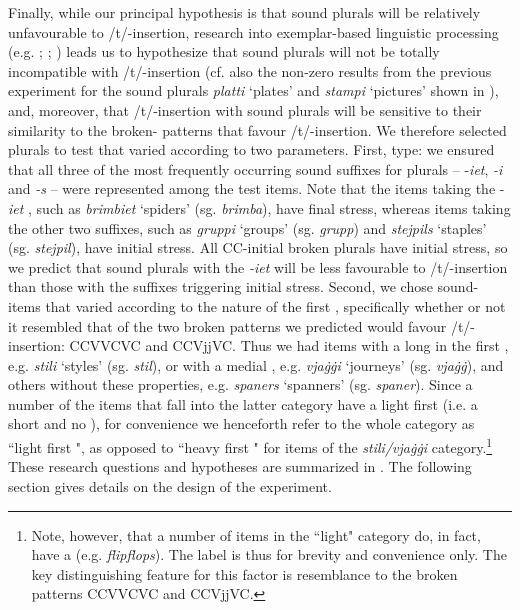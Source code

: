 \documentclass[output=paper]{langsci/langscibook}
\begin{document}
Finally, while our principal hypothesis is that sound plurals will be relatively unfavourable to /t/-insertion, research into exemplar-based linguistic processing (e.g. \citealt{RumelhartMcClelland1986}; \citealt{Bod1998}; \citealt{Eddington2009}) leads us to hypothesize that sound plurals will not be totally incompatible with /t/-insertion (cf. also the non-zero results from the previous experiment for the sound plurals \textit{platti} ‘plates’ and \textit{stampi} ‘pictures’ shown in ), and, moreover, that /t/-insertion with sound plurals will be sensitive to their  similarity to the broken- patterns that favour /t/-insertion. We therefore selected plurals to test that varied according to two parameters. First,  type: we ensured that all three of the most frequently occurring sound  suffixes for  plurals – -\textit{iet}, \textit{{}-i} and \textit{{}-s} – were represented among the test items. Note that the items taking the -\textit{iet}  , such as \textit{brimbiet} ‘spiders’ (sg. \textit{brimba}), have final stress, whereas items taking the other two suffixes, such as \textit{gruppi} ‘groups’ (sg. \textit{grupp}) and \textit{stejpils} ‘staples’ (sg. \textit{stejpil}), have initial stress. All CC-initial  broken plurals have initial stress, so we predict that sound plurals with the \textit{{}-iet}  will be less favourable to /t/-insertion than those with the suffixes triggering initial stress. Second, we chose sound- items that varied according to the nature of the first , specifically whether or not it resembled that of the two broken  patterns we predicted would favour /t/-insertion: CCVVCVC and CCVjjVC. Thus we had items with a long  in the first , e.g. \textit{stili} ‘styles’ (sg. \textit{stil}), or with a medial , e.g. \textit{vja\.g\.gi} ‘journeys’ (sg. \textit{vja\.g\.g}), and others without these properties, e.g. \textit{spaners} ‘spanners’ (sg. \textit{spaner}). Since a number of the items that fall into the latter category have a light first  (i.e. a short  and no ), for convenience we henceforth refer to the whole category as ``light first ", as opposed to ``heavy first " for items of the \textit{stili/vja\.g\.gi} category.\footnote{Note, however, that a number of items in the ``light" category do, in fact, have a  (e.g. \textit{flipflops}). The label is thus for brevity and convenience only. The key distinguishing feature for this factor is resemblance to the broken  patterns CCVVCVC and CCVjjVC.} These research questions and hypotheses are summarized in . The following section gives details on the design of the experiment.
\end{document}
